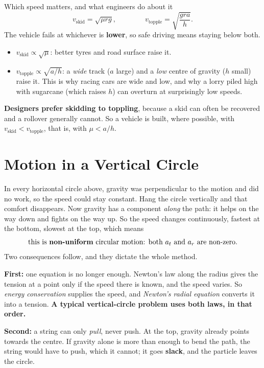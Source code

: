 \begin{remarkbox}{Which speed matters, and what engineers do about it}
\[
v_{\text{skid}}=\sqrt{\mu rg},
\qquad\qquad
v_{\text{topple}}=\sqrt{\frac{gra}{h}}.
\]
The vehicle fails at whichever is \textbf{lower}, so safe driving means staying below both.
\begin{itemize}
\item $v_{\text{skid}}\propto\sqrt{\mu}$: better tyres and road surface raise it.
\item $v_{\text{topple}}\propto\sqrt{a/h}$: a \emph{wide} track ($a$ large) and a \emph{low} centre of
      gravity ($h$ small) raise it. This is why racing cars are wide and low, and why a lorry piled
      high with sugarcane (which raises $h$) can overturn at surprisingly low speeds.
\end{itemize}
\textbf{Designers prefer skidding to toppling}, because a skid can often be recovered and a rollover
generally cannot. So a vehicle is built, where possible, with $v_{\text{skid}}<v_{\text{topple}}$,
that is, with $\mu<a/h$.
\end{remarkbox}

\section{Motion in a Vertical Circle}\label{sec:vertcircle}

In every horizontal circle above, gravity was perpendicular to the motion and did no work, so the speed
could stay constant. Hang the circle vertically and that comfort disappears. Now gravity has a component
\emph{along} the path: it helps on the way down and fights on the way up. So the speed changes
continuously, fastest at the bottom, slowest at the top, which means
\[
\text{this is \textbf{non-uniform} circular motion: both } a_t \text{ and } a_r \text{ are non-zero.}
\]
Two consequences follow, and they dictate the whole method.

\smallskip
\textbf{First:} one equation is no longer enough. Newton's law along the radius gives the tension at a
point only if the speed there is known, and the speed varies. So \emph{energy conservation} supplies the
speed, and \emph{Newton's radial equation} converts it into a tension. \textbf{A typical
vertical-circle problem uses both laws, in that order.}

\smallskip
\textbf{Second:} a string can only \emph{pull}, never push. At the top, gravity already points towards
the centre. If gravity alone is more than enough to bend the path, the string would have to push, which
it cannot; it goes \textbf{slack}, and the particle leaves the circle.

